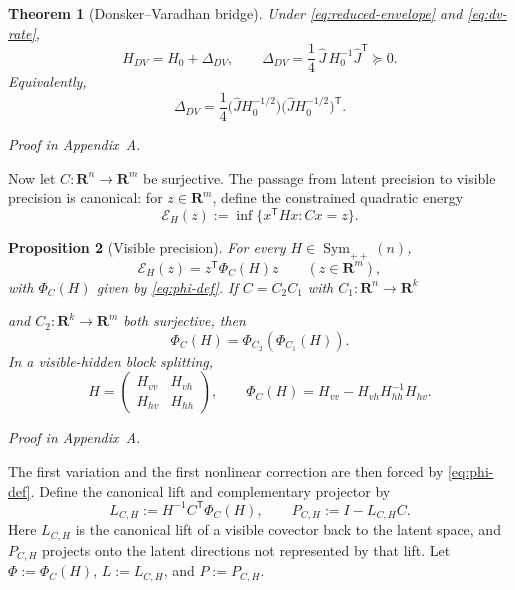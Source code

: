 \documentclass[11pt,a4paper]{article}
\numberwithin{equation}{section}
\DeclareMathOperator{\Sym}{Sym}
\newcommand{\R}{\mathbf R}
\theoremstyle{thmcompact}
\newtheorem{theorem}{Theorem}[section]
\newtheorem{proposition}[theorem]{Proposition}
\theoremstyle{remark}
\newcommand{\proofappendix}{\par{\hfill\scriptsize\emph{Proof in Appendix~A.}}\par}
\begin{document}
\begin{theorem}[Donsker--Varadhan bridge]
\label{thm:dv-bridge}
Under \eqref{eq:reduced-envelope} and \eqref{eq:dv-rate},
\begin{equation}
H_{DV}=H_0+\Delta_{DV},
\qquad
\Delta_{DV}=\frac14\,\widehat J\,H_0^{-1}\widehat J^{\mathsf T}\succeq 0.
\label{eq:dv-bridge}
\end{equation}
Equivalently,
\begin{equation}
\Delta_{DV}=\frac14\bigl(\widehat JH_0^{-1/2}\bigr)\bigl(\widehat JH_0^{-1/2}\bigr)^{\mathsf T}.
\label{eq:dv-gram}
\end{equation}
\end{theorem}

\proofappendix

Now let $C:\R^n\to\R^m$ be surjective. The passage from latent precision to visible precision is canonical: for $z\in\R^m$, define the constrained quadratic energy
\begin{equation}
\mathcal E_H(z):=\inf\{x^{\mathsf T}Hx:Cx=z\}.
\label{eq:energy-def}
\end{equation}

\begin{proposition}[Visible precision]
\label{prop:visible-precision}
For every $H\in\Sym_{++}(n)$,
\begin{equation}
\mathcal E_H(z)=z^{\mathsf T}\Phi_C(H)z
\qquad (z\in\R^m),
\label{eq:visible-variational}
\end{equation}
with $\Phi_C(H)$ given by \eqref{eq:phi-def}. If $C=C_2C_1$ with $C_1:\R^n\to\R^k$

and $C_2:\R^k\to\R^m$ both surjective, then
\begin{equation}
\Phi_C(H)=\Phi_{C_2}(\Phi_{C_1}(H)).
\label{eq:tower-law}
\end{equation}
In a visible-hidden block splitting,
\begin{equation}
H=
\begin{pmatrix}
H_{vv} & H_{vh}\\
H_{hv} & H_{hh}
\end{pmatrix},
\qquad
\Phi_C(H)=H_{vv}-H_{vh}H_{hh}^{-1}H_{hv}.
\label{eq:schur-form}
\end{equation}
\end{proposition}

\proofappendix

The first variation and the first nonlinear correction are then forced by \eqref{eq:phi-def}. Define the canonical lift and complementary projector by
\begin{equation}
L_{C,H}:=H^{-1}C^{\mathsf T}\Phi_C(H),
\qquad
P_{C,H}:=I-L_{C,H}C.
\label{eq:lift-projector}
\end{equation}
Here $L_{C,H}$ is the canonical lift of a visible covector back to the latent space, and $P_{C,H}$ projects onto the latent directions not represented by that lift.
Let $\Phi:=\Phi_C(H)$, $L:=L_{C,H}$, and $P:=P_{C,H}$.
\end{document}
